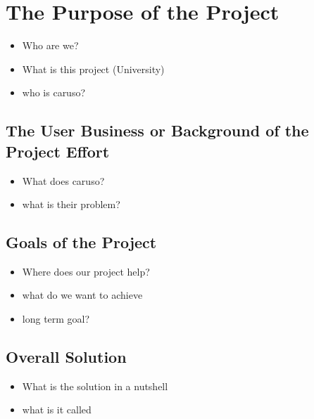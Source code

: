 \chapter{The Purpose of the Project}
\begin{itemize}
  \item Who are we?
  \item What is this project (University)
  \item who is caruso?
\end{itemize}

\section{The User Business or Background of the Project Effort}
\begin{itemize}
  \item What does caruso?
  \item what is their problem?
\end{itemize}

\section{Goals of the Project}
\begin{itemize}
  \item Where does our project help?
  \item what do we want to achieve
  \item long term goal?
\end{itemize}

\section{Overall Solution}
\begin{itemize}
  \item What is the solution in a nutshell
  \item what is it called
\end{itemize}